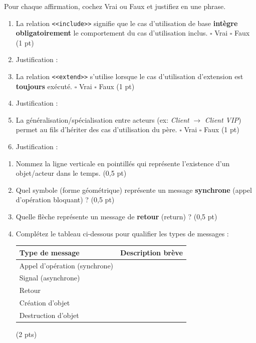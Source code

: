 \documentclass[11pt]{article}
\begin{document}
\begin{exercice}
Pour chaque affirmation, cochez Vrai ou Faux et justifiez en une phrase.
\begin{enumerate}
    \item La relation \texttt{<<include>>} signifie que le cas d'utilisation de base \textbf{intègre obligatoirement} le comportement du cas d'utilisation inclus. \hfill $\square$ Vrai \quad $\square$ Faux \hfill (1 pt)
    \item Justification : \underline{\hspace{12cm}}
    \item La relation \texttt{<<extend>>} s'utilise lorsque le cas d'utilisation d'extension est \textbf{toujours} exécuté. \hfill $\square$ Vrai \quad $\square$ Faux \hfill (1 pt)
    \item Justification : \underline{\hspace{12cm}}
    \item La généralisation/spécialisation entre acteurs (ex: \textit{Client} $\rightarrow$ \textit{Client VIP}) permet au fils d'hériter des cas d'utilisation du père. \hfill $\square$ Vrai \quad $\square$ Faux \hfill (1 pt)
    \item Justification : \underline{\hspace{12cm}}
\end{enumerate}
\end{exercice}

\begin{exercice}
\begin{enumerate}
    \item Nommez la ligne verticale en pointillés qui représente l'existence d'un objet/acteur dans le temps. \hfill (0,5 pt)
    \item Quel symbole (forme géométrique) représente un message \textbf{synchrone} (appel d'opération bloquant) ? \hfill (0,5 pt)
    \item Quelle flèche représente un message de \textbf{retour} (return) ? \hfill (0,5 pt)
    \item Complétez le tableau ci-dessous pour qualifier les types de messages :
    \begin{tabularx}{\linewidth}{l X}
    \toprule
    Type de message & Description brève \\
    \midrule
    Appel d'opération (synchrone) & \underline{\hspace{8cm}} \\
    Signal (asynchrone) & \underline{\hspace{8cm}} \\
    Retour & \underline{\hspace{8cm}} \\
    Création d'objet & \underline{\hspace{8cm}} \\
    Destruction d'objet & \underline{\hspace{8cm}} \\
    \bottomrule
    \end{tabularx}
    \hfill (2 pts)
\end{enumerate}
\end{exercice}
\end{document}
